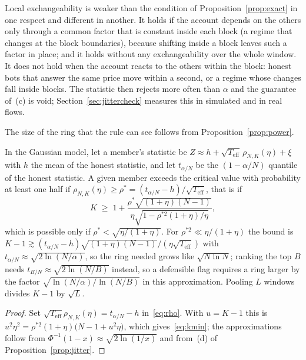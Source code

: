 Local exchangeability is weaker than the condition of Proposition~\ref{prop:exact} in one respect and different in another. It holds if the account depends on the others only through a common factor that is constant inside each block (a regime that changes at the block boundaries), because shifting inside a block leaves such a factor in place; and it holds without any exchangeability over the whole window. It does not hold when the account reacts to the others within the block: honest bots that answer the same price move within a second, or a regime whose changes fall inside blocks. The statistic then rejects more often than $\alpha$ and the guarantee of~(c) is void; Section~\ref{sec:jittercheck} measures this in simulated and in real flows.

The size of the ring that the rule can see follows from Proposition~\ref{prop:power}.

\begin{corollary}\label{cor:kmin}
In the Gaussian model, let a member's statistic be $Z\approx h+\sqrt{T_{\mathrm{eff}}}\,\rho_{N,K}(\eta)+\xi$ with $h$ the mean of the honest statistic, and let $t_{\alpha/N}$ be the $(1-\alpha/N)$ quantile of the honest statistic. A given member exceeds the critical value with probability at least one half if $\rho_{N,K}(\eta)\ge\rho^\ast=(t_{\alpha/N}-h)/\sqrt{T_{\mathrm{eff}}}$, that is if
\begin{equation}
K\;\ge\;1+\frac{\rho^\ast\sqrt{(1+\eta)(N-1)}}{\eta\sqrt{1-\rho^{\ast2}(1+\eta)/\eta}},
\label{eq:kmin}
\end{equation}
which is possible only if $\rho^\ast<\sqrt{\eta/(1+\eta)}$. For $\rho^{\ast2}\ll\eta/(1+\eta)$ the bound is $K-1\gtrsim(t_{\alpha/N}-h)\sqrt{(1+\eta)(N-1)}/(\eta\sqrt{T_{\mathrm{eff}}})$ with $t_{\alpha/N}\approx\sqrt{2\ln(N/\alpha)}$, so the ring needed grows like $\sqrt{N\ln N}$; ranking the top $B$ needs $t_{B/N}\approx\sqrt{2\ln(N/B)}$ instead, so a defensible flag requires a ring larger by the factor $\sqrt{\ln(N/\alpha)/\ln(N/B)}$ in this approximation. Pooling $L$ windows divides $K-1$ by $\sqrt L$.
\end{corollary}
\begin{proof}
Set $\sqrt{T_{\mathrm{eff}}}\rho_{N,K}(\eta)=t_{\alpha/N}-h$ in~\eqref{eq:rho}. With $u=K-1$ this is $u^2\eta^2=\rho^{\ast2}(1+\eta)\bigl(N-1+u^2\eta\bigr)$, which gives~\eqref{eq:kmin}; the approximations follow from $\Phi^{-1}(1-x)\approx\sqrt{2\ln(1/x)}$ and from~(d) of Proposition~\ref{prop:jitter}. \qedhere
\end{proof}

